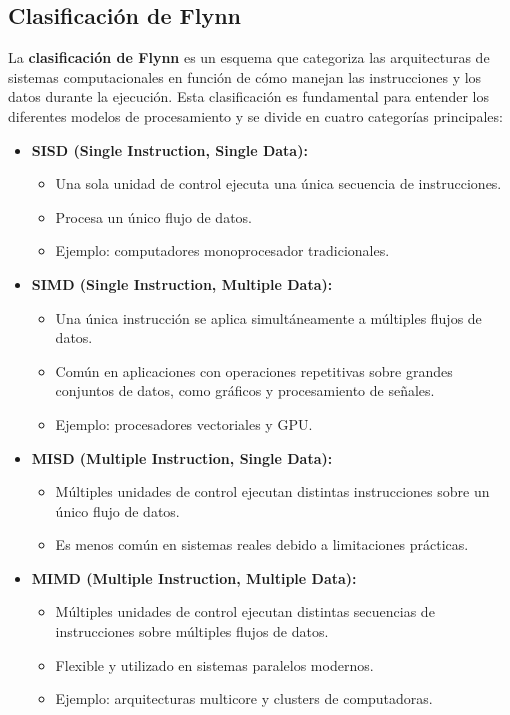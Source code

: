 \documentclass[a4paper,12pt]{article}
\begin{document}
\subsection{Clasificación de Flynn}

La \textbf{clasificación de Flynn} es un esquema que categoriza las arquitecturas de sistemas computacionales en función de cómo manejan las instrucciones y los datos durante la ejecución. Esta clasificación es fundamental para entender los diferentes modelos de procesamiento y se divide en cuatro categorías principales:

\begin{itemize}
    \item \textbf{SISD (Single Instruction, Single Data):} 
    \begin{itemize}
        \item Una sola unidad de control ejecuta una única secuencia de instrucciones.
        \item Procesa un único flujo de datos.
        \item Ejemplo: computadores monoprocesador tradicionales.
    \end{itemize}

    \item \textbf{SIMD (Single Instruction, Multiple Data):}
    \begin{itemize}
        \item Una única instrucción se aplica simultáneamente a múltiples flujos de datos.
        \item Común en aplicaciones con operaciones repetitivas sobre grandes conjuntos de datos, como gráficos y procesamiento de señales.
        \item Ejemplo: procesadores vectoriales y GPU.
    \end{itemize}

    \item \textbf{MISD (Multiple Instruction, Single Data):}
    \begin{itemize}
        \item Múltiples unidades de control ejecutan distintas instrucciones sobre un único flujo de datos.
        \item Es menos común en sistemas reales debido a limitaciones prácticas.
    \end{itemize}

    \item \textbf{MIMD (Multiple Instruction, Multiple Data):}
    \begin{itemize}
        \item Múltiples unidades de control ejecutan distintas secuencias de instrucciones sobre múltiples flujos de datos.
        \item Flexible y utilizado en sistemas paralelos modernos.
        \item Ejemplo: arquitecturas multicore y clusters de computadoras.
    \end{itemize}
\end{itemize}
\end{document}
